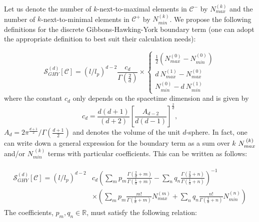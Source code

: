 \documentclass[12pt]{article}
\newcommand{\be}{\begin{equation}}
\newcommand{\ee}{\end{equation}}
\newcommand{\mb}[1]{\marginnote{\texttt{\small MB:\,#1}}}
\begin{document}
Let us denote the number of $k$-next-to-maximal elements in $\mathcal C^-$ by $N_{max}^{(k)}$ and the number of $k$-next-to-minimal elements in $\mathcal C^+$  by $N_{min}^{(k)}$. We propose the following definitions for the discrete Gibbons-Hawking-York boundary term (one can adopt the appropriate definition to best suit their calculation needs):\mb{put $\Sigma$ in argument, $S[\mathcal C, \Sigma]$?}

\be\label{GH_boundary_to_causet}
 \mathcal{S}^{(d)}_{GHY}[\mathcal C]=\left(l/l_p\right)^{d-2}\frac{c_{d}}{\Gamma\left(\frac{2}{d} \right)}\times
  \begin{cases}
   \frac{1}{2}\left(N_{max}^{(0)}-N_{min}^{(0)}\right) \\
   d\: N_{max}^{(1)}-N_{max}^{(0)} \\
   N_{min}^{(0)}-d\: N_{min}^{(1)}
  \end{cases}
\ee
where the constant $c_{d}$ only depends on the spacetime dimension and is given by
\be\label{Cn}
c_{d}=\frac{d(d+1)}{(d+2)}\left[\frac{A_{d-2}}{d(d-1)}\right]^{\frac{2}{d}},
\ee
$A_d=2\pi^\frac{d+1}2/\Gamma\left(\frac{d+1}{2}\right)$ and denotes the volume of the unit $d$-sphere. In fact, one can write down a general expression for the boundary term as a sum over $k$  $N_{\vphantom{i}max}^{\: (k)}$ and/or $N_{min}^{\: (k)}$ terms with particular coefficients. This can be written as follows:

\begin{gather}\label{general_boundary_sum}
\begin{aligned}
\mathcal{S}^{(d)}_{GHY}[\mathcal C]=\left(l/l_p\right)^{d-2} & c_{d}\left( \sum_m p_m \frac{\Gamma\left(\frac{2}{d}+m \right)}{\Gamma\left(\frac{1}{d}+m \right)}  - \sum_n q_n\frac{\Gamma\left(\frac{2}{d}+n \right)}{\Gamma\left(\frac{1}{d}+n \right)} \right)^{-1} \\
& \times \left( \sum_m p_m \frac{m!}{\Gamma\left(\frac{1}{d}+m \right)} N_{max}^{(m)}
+  \sum_n q_n \frac{n!}{\Gamma\left(\frac{1}{d}+n \right)} N_{min}^{(n)}\right)
\end{aligned}
\end{gather}
The coefficients, $p_m , q_n \in \mathbb{R}$, must satisfy the following relation:
\end{document}
